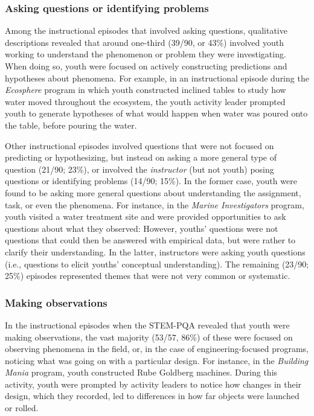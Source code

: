 \documentclass[]{msu-thesis}
\theoremstyle{definition}
\theoremstyle{definition}
\theoremstyle{definition}
\theoremstyle{remark}
\begin{document}
\subsubsection{Asking questions or identifying
problems}\label{asking-questions-or-identifying-problems}

Among the instructional episodes that involved asking questions,
qualitative descriptions revealed that around one-third (39/90, or 43\%)
involved youth working to understand the phenomenon or problem they were
investigating. When doing so, youth were focused on actively
constructing predictions and hypotheses about phenomena. For example, in
an instructional episode during the \emph{Ecosphere} program in which
youth constructed inclined tables to study how water moved throughout
the ecosystem, the youth activity leader prompted youth to generate
hypotheses of what would happen when water was poured onto the table,
before pouring the water.

Other instructional episodes involved questions that were not focused on
predicting or hypothesizing, but instead on asking a more general type
of question (21/90; 23\%), or involved the \emph{instructor} (but not
youth) posing questions or identifying problems (14/90; 15\%). In the
former case, youth were found to be asking more general questions about
understanding the assignment, task, or even the phenomena. For instance,
in the \emph{Marine Investigators} program, youth visited a water
treatment site and were provided opportunities to ask questions about
what they observed: However, youths' questions were not questions that
could then be answered with empirical data, but were rather to clarify
their understanding. In the latter, instructors were asking youth
questions (i.e., questions to elicit youths' conceptual understanding).
The remaining (23/90; 25\%) episodes represented themes that were not
very common or systematic.

\subsubsection{Making observations}\label{making-observations}

In the instructional episodes when the STEM-PQA revealed that youth were
making observations, the vast majority (53/57, 86\%) of these were
focused on observing phenomena in the field, or, in the case of
engineering-focused programs, noticing what was going on with a
particular design. For instance, in the \emph{Building Mania} program,
youth constructed Rube Goldberg machines. During this activity, youth
were prompted by activity leaders to notice how changes in their design,
which they recorded, led to differences in how far objects were launched
or rolled.
\end{document}
